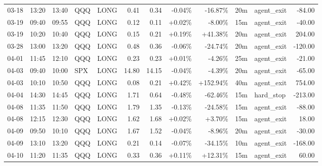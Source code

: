 \documentclass[11pt,a4paper]{article}
\begin{document}
\begin{center}
\begin{longtable}{>{\color{txtmain}}l l l l l r r r r r >{\color{txtmain}}l r}
03-18 & 13:20 & 13:40 & QQQ & LONG & 0.41 & 0.34 & \textcolor{lossred}{-0.04\%} & \textcolor{lossred}{-16.87\%} & 20m & agent\_exit & \textcolor{lossred}{-84.00} \\
03-19 & 09:40 & 09:55 & QQQ & LONG & 0.12 & 0.11 & \textcolor{wingreen}{+0.02\%} & \textcolor{lossred}{-8.00\%} & 15m & agent\_exit & \textcolor{lossred}{-40.00} \\
03-19 & 10:20 & 10:40 & QQQ & LONG & 0.15 & 0.21 & \textcolor{wingreen}{+0.19\%} & \textcolor{wingreen}{+41.38\%} & 20m & agent\_exit & \textcolor{wingreen}{204.00} \\
03-28 & 13:00 & 13:20 & QQQ & LONG & 0.48 & 0.36 & \textcolor{lossred}{-0.06\%} & \textcolor{lossred}{-24.74\%} & 20m & agent\_exit & \textcolor{lossred}{-120.00} \\
04-01 & 11:45 & 12:10 & QQQ & LONG & 0.23 & 0.23 & \textcolor{wingreen}{+0.01\%} & \textcolor{lossred}{-4.26\%} & 25m & agent\_exit & \textcolor{lossred}{-21.00} \\
04-03 & 09:40 & 10:00 & SPX & LONG & 14.80 & 14.15 & \textcolor{lossred}{-0.04\%} & \textcolor{lossred}{-4.39\%} & 20m & agent\_exit & \textcolor{lossred}{-65.00} \\
04-03 & 10:10 & 10:50 & QQQ & LONG & 0.08 & 0.21 & \textcolor{wingreen}{+0.42\%} & \textcolor{wingreen}{+152.94\%} & 40m & agent\_exit & \textcolor{wingreen}{754.00} \\
04-04 & 14:30 & 14:45 & QQQ & LONG & 1.71 & 0.64 & \textcolor{lossred}{-0.48\%} & \textcolor{lossred}{-62.46\%} & 15m & hard\_stop & \textcolor{lossred}{-213.00} \\
04-08 & 11:35 & 11:50 & QQQ & LONG & 1.79 & 1.35 & \textcolor{lossred}{-0.13\%} & \textcolor{lossred}{-24.58\%} & 15m & agent\_exit & \textcolor{lossred}{-88.00} \\
04-08 & 12:15 & 12:30 & QQQ & LONG & 1.62 & 1.68 & \textcolor{wingreen}{+0.02\%} & \textcolor{wingreen}{+3.70\%} & 15m & agent\_exit & \textcolor{wingreen}{18.00} \\
04-09 & 09:50 & 10:10 & QQQ & LONG & 1.67 & 1.52 & \textcolor{lossred}{-0.04\%} & \textcolor{lossred}{-8.96\%} & 20m & agent\_exit & \textcolor{lossred}{-30.00} \\
04-09 & 13:10 & 13:20 & QQQ & LONG & 0.21 & 0.14 & \textcolor{lossred}{-0.07\%} & \textcolor{lossred}{-34.15\%} & 10m & agent\_exit & \textcolor{lossred}{-168.00} \\
04-10 & 11:20 & 11:35 & QQQ & LONG & 0.33 & 0.36 & \textcolor{wingreen}{+0.11\%} & \textcolor{wingreen}{+12.31\%} & 15m & agent\_exit & \textcolor{wingreen}{60.00} \\

\end{longtable}
\end{center}
\end{document}
